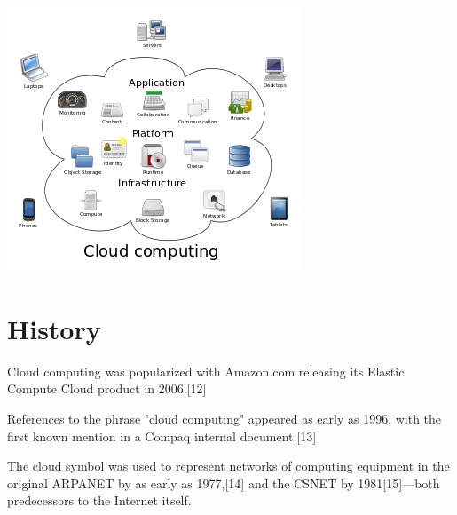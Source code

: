 \documentclass[11pt]{article}
\begin{document}
\includegraphics[scale=1]{a4.png}
\newpage
\tableofcontents
\newpage
\section{\color{green}History}
Cloud computing was popularized with Amazon.com releasing its Elastic Compute Cloud product in 2006.[12]

References to the phrase "cloud computing" appeared as early as 1996, with the first known mention in a Compaq internal document.[13]

The cloud symbol was used to represent networks of computing equipment in the original ARPANET by as early as 1977,[14] and the CSNET by 1981[15]—both predecessors to the Internet itself.
\end{document}
